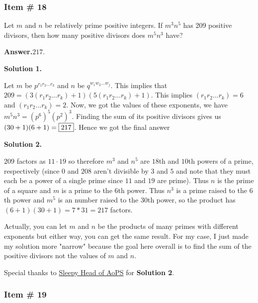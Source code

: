\documentclass[11pt,paper=letter]{scrartcl}
\newcommand{\ans}[1]{{\sffamily \bfseries Answer.}\;\(\boxed{\text{#1}}\).}
\newcommand{\soln}[1]{{\sffamily \bfseries Solution #1.}\;}
\newenvironment{rem}%
{\noindent \ignorespaces \small \sffamily  \sansmath {\bfseries \color{DarkMidnightBlue} Remark.}}%
{\ignorespacesafterend}
\newcommand{\joshbf}[1]{{\bfseries \sffamily \color{black} #1}}
\begin{document}
\subsubsection{Item \# 18}

\begin{probboxed}
 Let $m$ and $n$ be relatively prime positive integers. If $m^3n^5$ has 209 positive divisors, then how many positive divisors does $m^5n^3$ have?
\end{probboxed}
\ans{217}

\soln1

Let $m$ be $p^{r_1r_2...r_k}$ and $n$ be $q^{w_1w_2...w_j}$. This implies that $209 = \left(3(r_1r_2...r_k) + 1\right)\left(5(r_1r_2...r_k) + 1\right)$. This implies $(r_1r_2...r_k) = 6$ and $(r_1r_2...r_k) =2$. Now, we got the values of these exponents, we have $m^5n^3 = (p^6)^5 (p^2)^3$. Finding the sum of its positive divisors gives us $(30+1)(6+1) = \fbox{217}$. Hence we got the final answer

\soln2

$209$ factors as $11\cdot19$ so therefore $m^3$ and $n^5$ are $18$th and $10$th powers of a prime, respectively (since $0$ and $208$ aren't divisible by $3$ and $5$ and note that they must each be a power of a single prime since $11$ and $19$ are prime). Thus $n$ is the prime of a square and $m$ is a prime to the $6$th power. Thus $n^3$ is a prime raised to the $6$th power and $m^5$ is an number raised to the $30$th power, so the product has $(6+1)(30+1)=7*31=217$ factors.

\begin{mdframed}
\begin{rem}
Actually, you can let $m$ and $n$ be the products of many primes with different exponents but either way, you can get the same result. For my case, I just made my solution more "narrow" because the goal here overall is to find the sum of the positive divisors not the values of $m$ and $n$.
\end{rem}

\begin{rem}
Special thanks to \href{https://artofproblemsolving.com/community/user/470584}{Sleepy Head of AoPS} for \joshbf{Solution 2}.
\end{rem}
\end{mdframed}

\subsubsection{Item \# 19}
\end{document}

